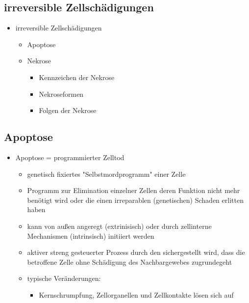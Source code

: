 \subsection{irreversible Zellschädigungen}
	\begin{itemize}
		\item irreversible Zellschädigungen
			\begin{itemize}
				\item Apoptose
				\item Nekrose
					\begin{itemize}
						\item Kennzeichen der Nekrose
						\item Nekroseformen
						\item Folgen der Nekrose
					\end{itemize}
			\end{itemize}
	\end{itemize}

\subsection{Apoptose}
	\begin{itemize}
		\item Apoptose = programmierter Zelltod
			\begin{itemize}
				\item genetisch fixiertes "Selbstmordprogramm" einer Zelle
				\item Programm zur Elimination einzelner Zellen deren Funktion nicht mehr benötigt wird oder die einen irreparablen (genetischen) Schaden erlitten haben
				\item kann von außen angeregt (extrinisisch) oder durch  zellinterne Mechanismen (intrinsisch) initiiert werden
				\item aktiver streng gesteuerter Prozess durch den sichergestellt wird, dass die betroffene Zelle ohne Schädigung des Nachbargewebes zugrundegeht
				\item typische Veränderungen:
					\begin{itemize}
						\item Kernschrumpfung, Zellorganellen und Zellkontakte lösen sich auf
					\end{itemize}
			\end{itemize}
	\end{itemize}

